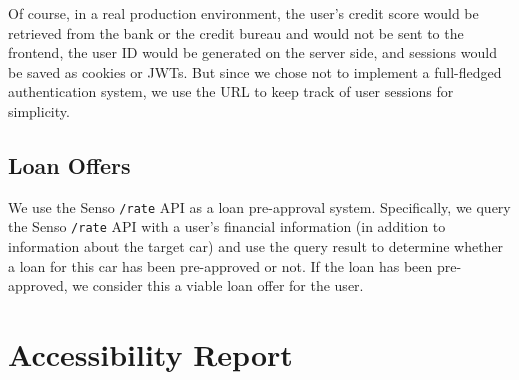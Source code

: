 \documentclass[fontsize=14pt]{article}
\def\code#1{\texttt{#1}}
\begin{document}
Of course, in a real production environment, the user's credit score would be retrieved from the bank or the credit bureau and would not be sent to the frontend, the user ID would be generated on the server side, and sessions would be saved as cookies or JWTs. But since we chose not to implement a full-fledged authentication system, we use the URL to keep track of user sessions for simplicity.

\subsection*{Loan Offers}
We use the Senso \code{/rate} API as a loan pre-approval system. Specifically, we query the Senso \code{/rate} API with a user's financial information (in addition to information about the target car) and use the query result to determine whether a loan for this car has been pre-approved or not. If the loan has been pre-approved, we consider this a viable loan offer for the user.

\section*{Accessibility Report}
\end{document}
